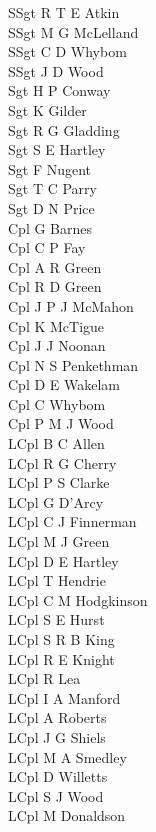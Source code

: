 \begin{multicols}{2}
  \noindent
  SSgt R T E Atkin \\
  SSgt M G McLelland \\
  SSgt C D Whybom \\
  SSgt J D Wood \\
  Sgt H P Conway \\
  Sgt K Gilder \\
  Sgt R G Gladding \\
  Sgt S E Hartley \\
  Sgt F Nugent \\
  Sgt T C Parry \\
  Sgt D N Price \\
  Cpl G Barnes \\
  Cpl C P Fay \\
  Cpl A R Green \\
  Cpl R D Green \\
  Cpl J P J McMahon \\
  Cpl K McTigue \\
  Cpl J J Noonan \\
  Cpl N S Penkethman \\
  Cpl D E Wakelam \\
  Cpl C Whybom \\
  Cpl P M J Wood \\
  LCpl B C Allen \\
  LCpl R G Cherry \\
  LCpl P S Clarke \\
  LCpl G D'Arcy \\
  LCpl C J Finnerman \\
  LCpl M J Green \\
  LCpl D E Hartley \\
  LCpl T Hendrie \\
  LCpl C M Hodgkinson \\
  LCpl S E Hurst \\
  LCpl S R B King \\
  LCpl R E Knight \\
  LCpl R Lea \\
  LCpl I A Manford \\
  LCpl A Roberts \\
  LCpl J G Shiels \\
  LCpl M A Smedley \\
  LCpl D Willetts \\
  LCpl S J Wood \\
  LCpl M Donaldson \\

\end{multicols}
